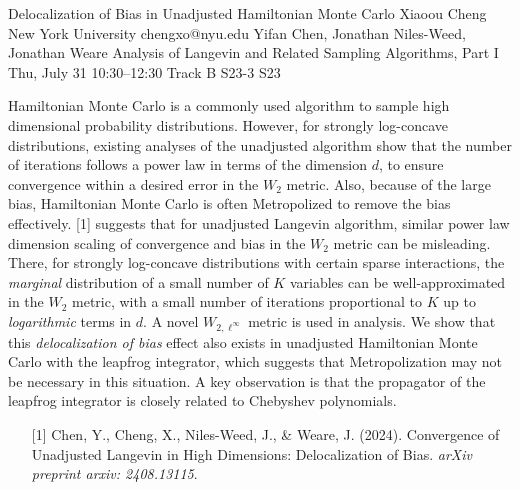 \begin{talk}
  {Delocalization of Bias in Unadjusted Hamiltonian Monte Carlo}%
  {Xiaoou Cheng}%
  {New York University}%
  {chengxo@nyu.edu}%
  {Yifan Chen, Jonathan Niles-Weed, Jonathan Weare}%
  {Analysis of Langevin and Related Sampling Algorithms, Part I}%
  {Thu, July 31 10:30–12:30 Track B}%
  {S23-3}%
  {S23}%
				
			
Hamiltonian Monte Carlo is a commonly used algorithm to sample high dimensional probability distributions. However, for strongly log-concave distributions, existing analyses of the unadjusted algorithm show that the number of iterations follows a power law in terms of the dimension $d$, to ensure convergence within a desired error in the $W_2$ metric. Also, because of the large bias, Hamiltonian Monte Carlo is often Metropolized to remove the bias effectively. [1] suggests that for unadjusted Langevin algorithm, similar power law dimension scaling of convergence and bias in the $W_2$ metric can be misleading. There, for strongly log-concave distributions with certain sparse interactions, the \emph{marginal} distribution of a small number of $K$ variables can be well-approximated in the $W_2$ metric, with a small number of iterations proportional to $K$ up to \emph{logarithmic} terms in $d$. A novel $W_{2,\ell^\infty}$ metric is used in analysis. We show that this \emph{delocalization of bias} effect also exists in unadjusted Hamiltonian Monte Carlo with the leapfrog integrator, which suggests that Metropolization may not be necessary in this situation. A key observation is that the propagator of the leapfrog integrator is closely related to Chebyshev polynomials.

\medskip

\begin{enumerate}
	\item[{[1]}] Chen, Y., Cheng, X., Niles-Weed, J., \& Weare, J. (2024). Convergence of Unadjusted Langevin in High Dimensions: Delocalization of Bias. \textit{arXiv preprint arxiv: 2408.13115}.
\end{enumerate}

\end{talk}

